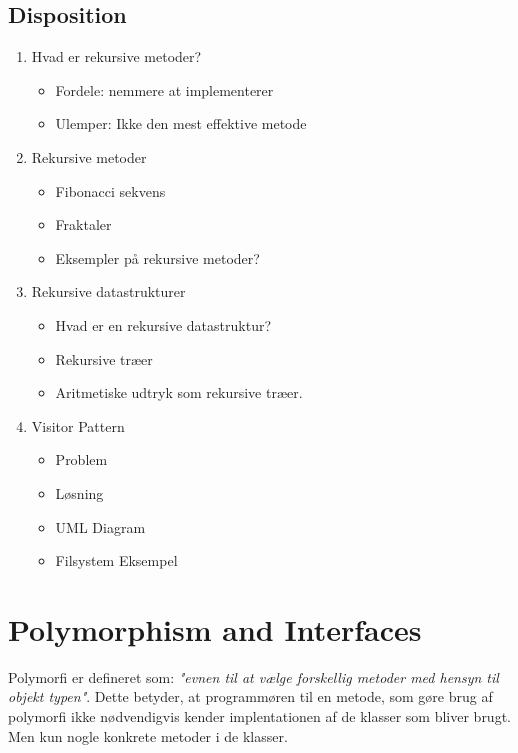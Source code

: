 \documentclass{article}
\begin{document}
\newpage
\subsection{Disposition}
\begin{enumerate}
	
	\item Hvad er rekursive metoder?
	\begin{itemize}
		\item Fordele: nemmere at implementerer
		\item Ulemper: Ikke den mest effektive metode
	\end{itemize}
	
	\item Rekursive metoder
	\begin{itemize}
		\item Fibonacci sekvens
		\item Fraktaler
		\item Eksempler på rekursive metoder?
		
	\end{itemize}
	\item Rekursive datastrukturer
	\begin{itemize}
		\item Hvad er en rekursive datastruktur?
		\item Rekursive træer
		\item Aritmetiske udtryk som rekursive træer. 
	\end{itemize}

	\item{Visitor Pattern}
	\begin{itemize}
		\item Problem
		\item Løsning
		\item UML Diagram
		\item Filsystem Eksempel
	\end{itemize}
	
\end{enumerate}

\newpage

\section{Polymorphism and Interfaces}
Polymorfi er defineret som: \textit{"evnen til at vælge forskellig metoder med hensyn til objekt typen"}. Dette betyder, at programmøren til en metode, som gøre brug af polymorfi ikke nødvendigvis kender implentationen af de klasser som bliver brugt. Men kun nogle konkrete metoder i de klasser. 
\end{document}
